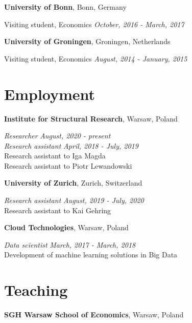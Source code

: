 \documentclass[margin,line]{res}
\newenvironment{list1}{
  \begin{list}{\ding{113}}{%
      \setlength{\itemsep}{0in}
      \setlength{\parsep}{0in} \setlength{\parskip}{0in}
      \setlength{\topsep}{0in} \setlength{\partopsep}{0in} 
      \setlength{\leftmargin}{0.17in}}}{\end{list}}
\begin{document}
\begin{resume}
{\bf University of Bonn}, Bonn, Germany\\
\vspace*{-.1in}
\begin{list1}
\item[] Visiting student, Economics \hfill \textit{October, 2016 - March, 2017}
\end{list1}

{\bf University of Groningen}, Groningen, Netherlands\\
\vspace*{-.1in}
\begin{list1}
\item[] Visiting student, Economics \hfill \textit{August, 2014 - January, 2015}
\end{list1}

\section{\sc Employment}
{\bf Institute for Structural Research}, Warsaw, Poland

\vspace{-.3cm}
{\em Researcher} \hfill \textit{August, 2020 - present}\\
{\em Research assistant} \hfill \textit{April, 2018 - July, 2019}\\
Research assistant to Iga Magda\\ 
Research assistant to Piotr Lewandowski 
\vspace*{.05in} 

{\bf University of Zurich}, Zurich, Switzerland

\vspace{-.3cm}
{\em Research assistant} \hfill \textit{August, 2019 - July, 2020}\\
Research assistant to Kai Gehring
\vspace*{.05in}  

{\bf Cloud Technologies}, Warsaw, Poland

\vspace{-.3cm}
{\em Data scientist} \hfill \textit{March, 2017 - March, 2018}\\
Development of machine learning solutions in Big Data
\vspace*{.05in}  

\section{\sc Teaching}
{\bf SGH Warsaw School of Economics}, Warsaw, Poland


\end{resume}
\end{document}
